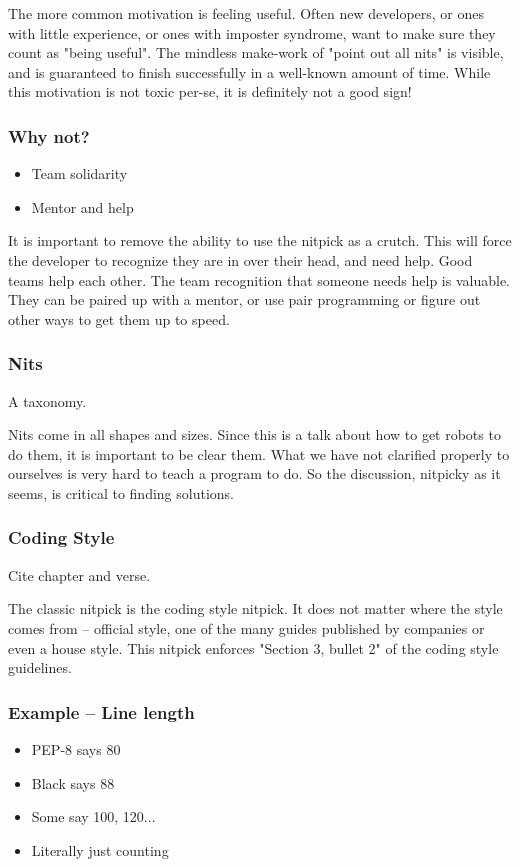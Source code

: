 The more common motivation is feeling useful.
Often new developers,
or ones with little experience,
or ones with imposter syndrome,
want to make sure they count as "being useful".
The mindless make-work of "point out all nits"
is visible,
and is guaranteed to finish successfully in a well-known amount of time.
While this motivation is not toxic per-se,
it is definitely not a good sign!

\begin{frame}
\frametitle{Why not?}
\begin{itemize}
\item Team solidarity
\item Mentor and help
\end{itemize}
\end{frame}

It is important to remove the ability to use the nitpick as a crutch.
This will force the developer to recognize they are in over their head,
and need help.
Good teams help each other.
The team recognition that someone needs help is valuable.
They can be paired up with a mentor,
or use pair programming
or figure out other ways to get them up to speed.

\begin{frame}
\frametitle{Nits}
A taxonomy.
\end{frame}

Nits come in all shapes and sizes.
Since this is a talk about how to get robots to do them,
it is important to be clear them.
What we have not clarified properly to ourselves
is very hard to teach a program to do.
So the discussion,
nitpicky as it seems,
is critical to finding solutions.

\begin{frame}
\frametitle{Coding Style}
Cite chapter and verse.
\end{frame}

The classic nitpick is the coding style nitpick.
It does not matter where the style comes from --
official style,
one of the many guides published by companies
or even a house style.
This nitpick enforces "Section 3, bullet 2"
of the coding style guidelines.

\begin{frame}
\frametitle{Example -- Line length}
\begin{itemize}
\item PEP-8 says 80
\item Black says 88
\item Some say 100, 120...
\item Literally just counting
\end{itemize}
\end{frame}

